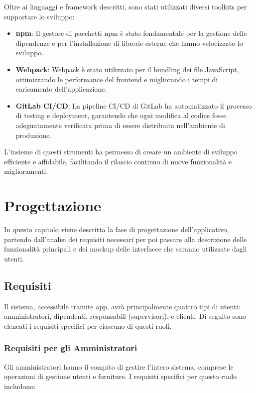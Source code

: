 \documentclass[twoside]{supsistudent}
\begin{document}
Oltre ai linguaggi e framework descritti, sono stati utilizzati diversi toolkits per supportare lo sviluppo:

\begin{itemize}
  \item \textbf{npm}: Il gestore di pacchetti npm è stato fondamentale per la gestione delle dipendenze e per l'installazione di librerie esterne che hanno velocizzato lo sviluppo.
  \item \textbf{Webpack}: Webpack è stato utilizzato per il bundling dei file JavaScript, ottimizzando le performance del frontend e migliorando i tempi di caricamento dell'applicazione.
  \item \textbf{GitLab CI/CD}: La pipeline CI/CD di GitLab ha automatizzato il processo di testing e deployment, garantendo che ogni modifica al codice fosse adeguatamente verificata prima di essere distribuita nell'ambiente di produzione.
\end{itemize}

L'insieme di questi strumenti ha permesso di creare un ambiente di sviluppo efficiente e affidabile, facilitando il rilascio continuo di nuove funzionalità e miglioramenti.

\chapter{Progettazione}

In questo capitolo viene descritta la fase di progettazione dell’applicativo, partendo dall'analisi dei requisiti necessari per poi passare alla descrizione delle funzionalità principali e dei mockup delle interfacce che saranno utilizzate dagli utenti.

\section{Requisiti}

Il sistema, accessibile tramite app, avrà principalmente quattro tipi di utenti: amministratori, dipendenti, responsabili (supervisori), e clienti. Di seguito sono elencati i requisiti specifici per ciascuno di questi ruoli.

\subsection{Requisiti per gli Amministratori}

Gli amministratori hanno il compito di gestire l'intero sistema, comprese le operazioni di gestione utenti e forniture. I requisiti specifici per questo ruolo includono:
\end{document}
